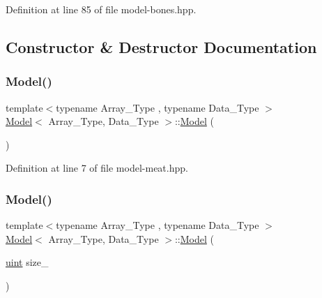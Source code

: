 Definition at line 85 of file model-\/bones.\+hpp.



\subsection{Constructor \& Destructor Documentation}
\mbox{\label{class_model_a38122122aa4eb799b90ed1ee49b9410c}} 
\subsubsection{\texorpdfstring{Model()}{Model()}\hspace{0.1cm}{\footnotesize\ttfamily [1/2]}}
{\footnotesize\ttfamily template$<$typename Array\+\_\+\+Type , typename Data\+\_\+\+Type $>$ \\
\hyperlink{class_model}{Model}$<$ Array\+\_\+\+Type, Data\+\_\+\+Type $>$\+::\hyperlink{class_model}{Model} (\begin{DoxyParamCaption}{ }\end{DoxyParamCaption})\hspace{0.3cm}{\ttfamily [inline]}}



Definition at line 7 of file model-\/meat.\+hpp.

\mbox{\label{class_model_a841a883c666ecd9b07385bfb36078bc5}} 
\subsubsection{\texorpdfstring{Model()}{Model()}\hspace{0.1cm}{\footnotesize\ttfamily [2/2]}}
{\footnotesize\ttfamily template$<$typename Array\+\_\+\+Type , typename Data\+\_\+\+Type $>$ \\
\hyperlink{class_model}{Model}$<$ Array\+\_\+\+Type, Data\+\_\+\+Type $>$\+::\hyperlink{class_model}{Model} (\begin{DoxyParamCaption}\item[{\hyperlink{typedefs_8hpp_a91ad9478d81a7aaf2593e8d9c3d06a14}{uint}}]{size\+\_\+ }\end{DoxyParamCaption})\hspace{0.3cm}{\ttfamily [inline]}}



